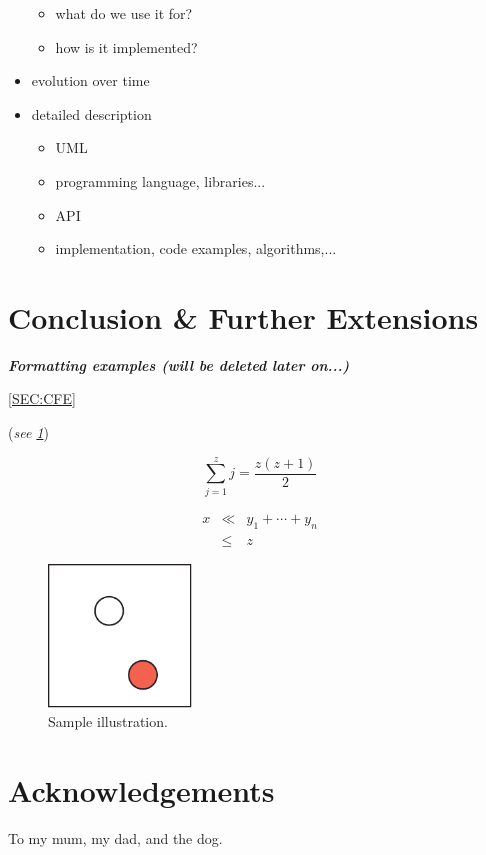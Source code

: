 \documentclass[conference]{acmsiggraph}
\begin{document}
\begin{itemize}
{\begin{itemize}
{\begin{itemize}
		\item what do we use it for?
		\item how is it implemented?
		\end{itemize}
	}
	\end{itemize}
}
\item evolution over time
\item{
	detailed description
	\begin{itemize}
	\item UML
	\item programming language, libraries...
	\item API
	\item implementation, code examples, algorithms,...
	\end{itemize}
}
\end{itemize}

\section{Conclusion \& Further Extensions}





\textit{\textbf{Formatting examples (will be deleted later on...)}}

\cref{SEC:CFE}\\

(\textit{see \cref{FIG:SAMPLE}})

\label{SEC:CFE}

\begin{equation}
 \sum_{j=1}^{z} j = \frac{z(z+1)}{2}
\end{equation}

\begin{eqnarray}
x & \ll & y_{1} + \cdots + y_{n} \\
  & \leq & z
\end{eqnarray}

\begin{figure}[ht]
  \centering
  \includegraphics[width=1.5in]{images/samplefigure}
  \caption{Sample illustration.}
  \label{FIG:SAMPLE}
\end{figure}

\section*{Acknowledgements}

To my mum, my dad, and the dog. 



\end{document}
